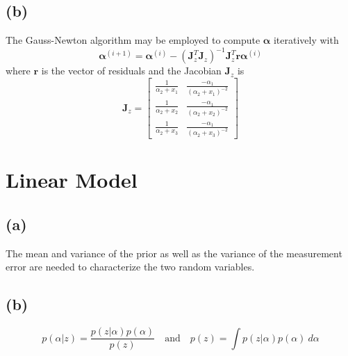 \documentclass[fleqn, letterpaper]{tufte-handout}
\begin{document}
\subsection{(b)}
The Gauss-Newton algorithm may be employed to compute $\bm{\alpha}$ iteratively with
\[\bm{\alpha}^{(i+1)} = \bm{\alpha}^{(i)} - (\bm{J}_z^T\bm{J}_z)^{-1}\bm{J}_z^T\bm r \bm{\alpha}^{(i)} 
\]
where $\bm{r}$ is the vector of residuals and the Jacobian $\bm{J}_z$ is
\[
        \bm{J}_z =
        \begin{bmatrix}
                \frac{1}{\alpha_2+x_1} & \frac{-\alpha_1}{(\alpha_2 + x_1)^{-2}} \\
                \frac{1}{\alpha_2+x_2} & \frac{-\alpha_1}{(\alpha_2 + x_2)^{-2}} \\
                \frac{1}{\alpha_2+x_3} & \frac{-\alpha_1}{(\alpha_2 + x_3)^{-2}}
        \end{bmatrix}
\]
\section{Linear Model}
\subsection{(a)}
The mean and variance of the prior as well as the variance of the measurement error are needed to characterize the two random variables.
\subsection{(b)}
\[
        p(\alpha|z) = \frac{p(z|\alpha)p(\alpha)}{p(z)}
        \quad \text{and} \quad
        p(z) = \int p(z|\alpha)p(\alpha)\ d\alpha
\]
\end{document}
